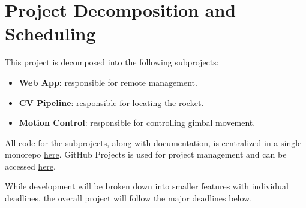 \documentclass{article}
\begin{document}
\section{Project Decomposition and Scheduling}

This project is decomposed into the following subprojects:

\begin{itemize}
  \item \textbf{Web App}: responsible for remote management.
  \item \textbf{CV Pipeline}: responsible for locating the rocket.
  \item \textbf{Motion Control}: responsible for controlling gimbal movement.
\end{itemize}

All code for the subprojects, along with documentation, is centralized in a
single monorepo \href{https://github.com/ZifanSi/vision-guided-tracker}{here}.
GitHub Projects is used for project management and can be accessed
\href{https://github.com/users/ZifanSi/projects/1}{here}.

While development will be broken down into smaller features with individual
deadlines, the overall project will follow the major deadlines below.
\end{document}
